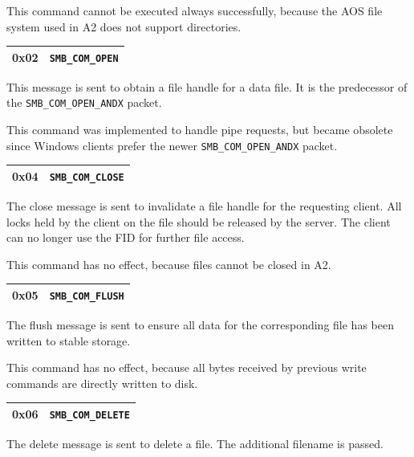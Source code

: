 \documentclass[11pt,a4paper]{book}
\begin{document}
This command cannot be executed always successfully, because the AOS file system used in A2 does not support directories.

\begin{center}
\renewcommand{\tabcolsep}{5mm}
\begin{tabular}{p{3cm}p{8cm}}
0x02 & \texttt{SMB\_COM\_OPEN} \\ 
\hline
\end{tabular}
\end{center}
This message is sent to obtain a file handle for a data file. It is the predecessor of the \texttt{SMB\_COM\_OPEN\_ANDX} packet.

This command was implemented to handle pipe requests, but became obsolete since Windows clients prefer the newer \texttt{SMB\_COM\_OPEN\_ANDX} packet.

\begin{center}
\renewcommand{\tabcolsep}{5mm}
\begin{tabular}{p{3cm}p{8cm}}
0x04 & \texttt{SMB\_COM\_CLOSE} \\
\hline
\end{tabular}
\end{center}
The close message is sent to invalidate a file handle for the requesting client. All locks held by the client on the file should be released by the server. The client can no longer use the FID for further file access.

This command has no effect, because files cannot be closed in A2.

\begin{center}
\renewcommand{\tabcolsep}{5mm}
\begin{tabular}{p{3cm}p{8cm}}
0x05 & \texttt{SMB\_COM\_FLUSH} \\
\hline
\end{tabular}
\end{center}
The flush message is sent to ensure all data for the corresponding file has been written to stable storage.

This command has no effect, because all bytes received by previous write commands are directly written to disk.

\begin{center}
\renewcommand{\tabcolsep}{5mm}
\begin{tabular}{p{3cm}p{8cm}}
0x06 & \texttt{SMB\_COM\_DELETE} \\
\hline
\end{tabular}
\end{center}
The delete message is sent to delete a file. The additional filename is passed.
\end{document}
